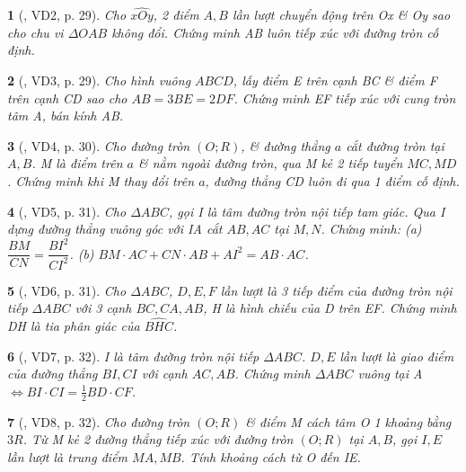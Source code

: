 \documentclass{article}
\newtheorem{baitoan}{}
\begin{document}
\begin{baitoan}[\cite{TLCT_THCS_Toan_9_hinh_hoc}, VD2, p. 29]
	Cho $\widehat{xOy}$, 2 điểm $A,B$ lần lượt chuyển động trên Ox \& Oy sao cho chu vi $\Delta OAB$ không đổi. Chứng minh AB luôn tiếp xúc với đường tròn cố định.
\end{baitoan}

\begin{baitoan}[\cite{TLCT_THCS_Toan_9_hinh_hoc}, VD3, p. 29]
	Cho hình vuông $ABCD$, lấy điểm E trên cạnh BC \& điểm F trên cạnh CD sao cho $AB = 3BE = 2DF$. Chứng minh EF tiếp xúc với cung tròn tâm A, bán kính AB.
\end{baitoan}

\begin{baitoan}[\cite{TLCT_THCS_Toan_9_hinh_hoc}, VD4, p. 30]
	Cho đường tròn $(O;R)$, \& đường thẳng $a$ cắt đường tròn tại $A,B$. M là điểm trên $a$ \& nằm ngoài đường tròn, qua M kẻ 2 tiếp tuyển $MC,MD$. Chứng minh khi M thay đổi trên $a$, đường thẳng CD luôn đi qua 1 điểm cố định.
\end{baitoan}

\begin{baitoan}[\cite{TLCT_THCS_Toan_9_hinh_hoc}, VD5, p. 31]
	Cho $\Delta ABC$, gọi I là tâm đường tròn nội tiếp tam giác. Qua I dựng đường thẳng vuông góc với IA cắt $AB,AC$ tại $M,N$. Chứng minh: (a) $\dfrac{BM}{CN} = \dfrac{BI^2}{CI^2}$. (b) $BM\cdot AC + CN\cdot AB + AI^2 = AB\cdot AC$.
\end{baitoan}

\begin{baitoan}[\cite{TLCT_THCS_Toan_9_hinh_hoc}, VD6, p. 31]
	Cho $\Delta ABC$, $D,E,F$ lần lượt là 3 tiếp điểm của đường tròn nội tiếp $\Delta ABC$ với 3 cạnh $BC,CA,AB$, H là hình chiếu của D trên EF. Chứng minh DH là tia phân giác của $\widehat{BHC}$.
\end{baitoan}

\begin{baitoan}[\cite{TLCT_THCS_Toan_9_hinh_hoc}, VD7, p. 32]
	I là tâm đường tròn nội tiếp $\Delta ABC$. $D,E$ lần lượt là giao điểm của đường thẳng $BI,CI$ với cạnh $AC,AB$. Chứng minh $\Delta ABC$ vuông tại A $\Leftrightarrow BI\cdot CI = \frac{1}{2}BD\cdot CF$.
\end{baitoan}

\begin{baitoan}[\cite{TLCT_THCS_Toan_9_hinh_hoc}, VD8, p. 32]
	Cho đường tròn $(O;R)$ \& điểm M cách tâm O 1 khoảng bằng $3R$. Từ M kẻ 2 đường thẳng tiếp xúc với đường tròn $(O;R)$ tại $A,B$, gọi $I,E$ lần lượt là trung điểm $MA,MB$. Tính khoảng cách từ O đến IE.
\end{baitoan}
\end{document}
